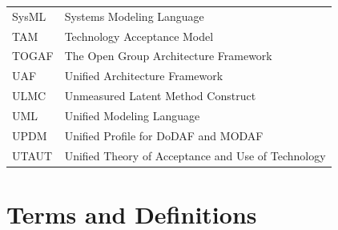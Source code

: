 \begin{singlespace}
\begin{longtable}{p{} p{}}
SysML     & Systems Modeling Language \\
TAM       & Technology Acceptance Model \\
TOGAF     & The Open Group Architecture Framework \\
UAF       & Unified Architecture Framework \\
ULMC      & Unmeasured Latent Method Construct \\
UML       & Unified Modeling Language \\
UPDM      & Unified Profile for DoDAF and MODAF \\
UTAUT     & Unified Theory of Acceptance and Use of Technology \\
\end{longtable}
\end{singlespace}

\section{Terms and Definitions}

